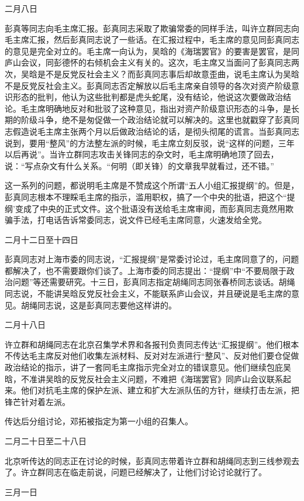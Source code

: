 \begin{maonote}
二月八日

彭真等同志向毛主席汇报。彭真同志采取了欺骗常委的同样手法，叫许立群同志向毛主席汇报，然后彭真同志说了一些话。在汇报过程中，毛主席的意见同彭真同志的意见是完全对立的。毛主席一向认为，吴晗的《海瑞罢官》的要害是罢官，是同庐山会议，同彭德怀的右倾机会主义有关的。这次，毛主席又当面问了彭真同志两次，吴晗是不是反党反社会主义？而彭真同志事后却故意歪曲，说毛主席认为吴晗不是反党反社会主义。彭真同志否定解放以后毛主席亲自领导的各次对资产阶级意识形态的批判，他认为这些批判都是虎头蛇尾，没有结论，他说这次要做政治结论。毛主席明确地反对和批驳了这种意见，指出对资产阶级意识形态的斗争，是长期的阶级斗争，绝不是匆促做一个政治结论就可以解决的。这里也就戳穿了彭真同志假造说毛主席主张两个月以后做政治结论的话，是彻头彻尾的谎言。当彭真同志说到，要用“整风”的方法整左派的时候，毛主席立刻反驳，说“这样的问题，三年以后再说”。当许立群同志攻击关锋同志的杂文时，毛主席明确地顶了回去，说：“写点杂文有什么关系。“何明（即关锋）的文章我早就看过，还不错。”

这一系列的问题，都说明毛主席是不赞成这个所谓“五人小组汇报提纲”的。但是，彭真同志根本不理睬毛主席的指示，滥用职权，搞了一个中央的批语，把这个“提纲’变成了中央的正式文件。这个批语没有送给毛主席审阅，而彭真同志竟然用欺骗手法，打电话告诉常委同志，说文件已经毛主席同意，火速发给全党。

二月十二日至十四日

彭真同志对上海市委的同志说，“汇报提纲”是常委讨论过，毛主席同意了的，问题都解决了，也不需要跟你们谈了。上海市委的同志提出：“提纲”中“不要局限于政治问题”等还需要研究。十三日，彭真同志指定胡绳同志同张春桥同志谈话。胡绳同志说，不能讲吴晗反党反社会主义，不能联系庐山会议，并且硬说是毛主席的意见。胡绳同志说，这是彭真同志要他这样讲的。

二月十八日

许立群和胡绳同志在北京召集学术界和各报刊负责同志传达“汇报提纲”。他们根本不传达毛主席反对他们收集左派材料、反对对左派进行“整风”、反对他们要仓促做政治结论的指示，讲了一套同毛主席指示完全对立的错误意见。他们继续包庇吴晗，不准讲吴晗的反党反社会主义问题，不难把《海瑞罢官》同庐山会议联系起来。他们对抗毛主席的保护左派、建立和扩大左派队伍的方针，继续打击左派，把锋芒针对着左派。

传达后分组讨论，邓拓被指定为第一小组的召集人。

二月二十日至二十八日

北京听传达的同志正在讨论的时候，彭真同志带着许立群和胡绳同志到三线参观去了。许立群同志在临走前说，问题已经解决了，让他们讨论讨论就行了。

三月一日


\end{maonote}
